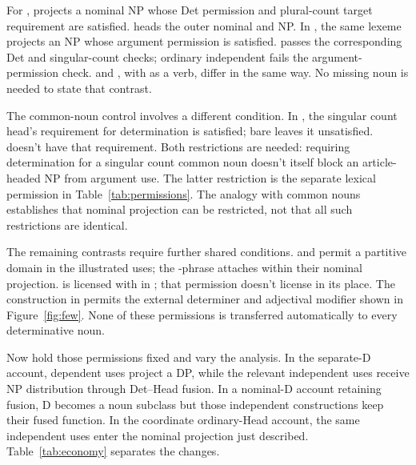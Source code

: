 \documentclass[12pt]{article}
\begin{document}
For ,  projects a nominal NP whose Det permission and plural-count target requirement are satisfied.  heads the outer nominal and NP. In , the same lexeme projects an NP whose argument permission is satisfied.  passes the corresponding Det and singular-count checks; ordinary independent  fails the argument-permission check.  and , with  as a verb, differ in the same way. No missing noun is needed to state that contrast.

The common-noun control involves a different condition. In , the singular count head's requirement for determination is satisfied; bare  leaves it unsatisfied.  doesn't have that requirement. Both restrictions are needed: requiring determination for a singular count common noun doesn't itself block an article-headed NP from argument use. The latter restriction is the separate lexical permission in Table~\ref{tab:permissions}. The analogy with common nouns establishes that nominal projection can be restricted, not that all such restrictions are identical.

The remaining contrasts require further shared conditions.  and  permit a partitive domain in the illustrated uses; the -phrase attaches within their nominal projection.  is licensed with  in ; that permission doesn't license  in its place. The  construction in  permits the external determiner and adjectival modifier shown in Figure~\ref{fig:few}. None of these permissions is transferred automatically to every determinative noun.

Now hold those permissions fixed and vary the analysis. In the separate-D account, dependent uses project a DP, while the relevant independent uses receive NP distribution through Det--Head fusion. In a nominal-D account retaining fusion, D becomes a noun subclass but those independent constructions keep their fused function. In the coordinate ordinary-Head account, the same independent uses enter the nominal projection just described. Table~\ref{tab:economy} separates the changes.
\end{document}
